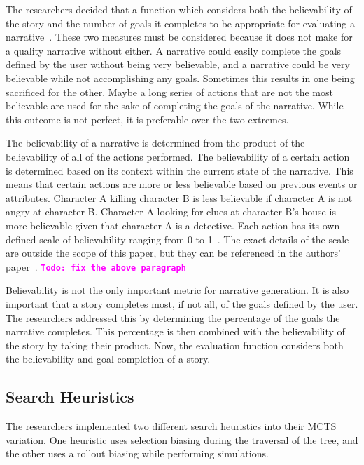 \documentclass{sig-alternate}
\newcommand{\comment}[1]{{\bf \tt  {#1}}}
\newcommand{\todo}[1]{\textcolor{magenta}{\comment{Todo: {#1}}}}
\begin{document}
The researchers decided that a function which considers both the believability of the story and the number of goals it completes to be appropriate for evaluating a narrative~\cite{Narrative}. These two measures must be considered because it does not make for a quality narrative without either. A narrative could easily complete the goals defined by the user without being very believable, and a narrative could be very believable while not accomplishing any goals. Sometimes this results in one being sacrificed for the other. Maybe a long series of actions that are not the most believable are used for the sake of completing the goals of the narrative. While this outcome is not perfect, it is preferable over the two extremes.

The believability of a narrative is determined from the product of the believability of all of the actions performed. The believability of a certain action is determined based on its context within the current state of the narrative. This means that certain actions are more or less believable based on previous events or attributes. Character A killing character B is less believable if character A is not angry at character B. Character A looking for clues at character B's house is more believable given that character A is a detective. Each action has its own defined scale of believability ranging from 0 to 1~\cite{Narrative}. The exact details of the scale are outside the scope of this paper, but they can be referenced in the authors' paper~\cite{Narrative}.
\todo{fix the above paragraph}

Believability is not the only important metric for narrative generation. It is also important that a story completes most, if not all, of the goals defined by the user. The researchers addressed this by determining the percentage of the goals the narrative completes. This percentage is then combined with the believability of the story by taking their product. Now, the evaluation function considers both the believability and goal completion of a story. 

\subsection{Search Heuristics}
The researchers implemented two different search heuristics into their MCTS variation. One heuristic uses selection biasing during the traversal of the tree, and the other uses a rollout biasing while performing simulations.
\end{document}
